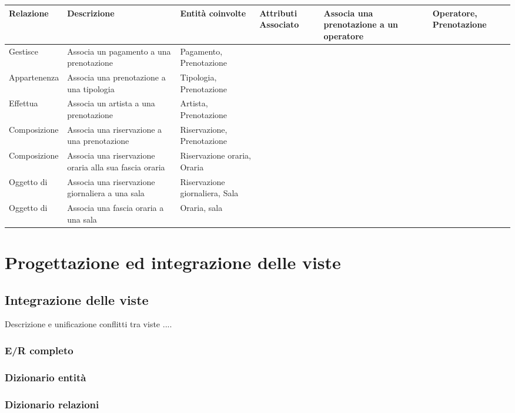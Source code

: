 \documentclass{article}
\begin{document}
\renewcommand*{\arraystretch}{1.4}
\begin{longtable}{|p{.15\linewidth}|p{.25\linewidth}|p{.2\linewidth}|p{.2\linewidth}|}
    \hline
    \textbf{Relazione} & \textbf{Descrizione} & \textbf{Entità coinvolte} & \textbf{Attributi} 
    \endhead 
    \hline
     Associato & Associa una prenotazione a un operatore & Operatore, Prenotazione &  \\ \hline
     Gestisce & Associa un pagamento a una prenotazione & Pagamento, Prenotazione &  \\ \hline
     Appartenenza & Associa una prenotazione a una tipologia & Tipologia, Prenotazione &  \\ \hline
     Effettua & Associa un artista a una prenotazione & Artista, Prenotazione &  \\ \hline
     Composizione & Associa una riservazione a una prenotazione & Riservazione, Prenotazione &  \\ \hline
     Composizione & Associa una riservazione oraria alla sua fascia oraria & Riservazione oraria, Oraria &  \\ \hline
     Oggetto di & Associa una riservazione giornaliera a una sala & Riservazione giornaliera, Sala &  \\ \hline
     Oggetto di & Associa una fascia oraria a una sala & Oraria, sala &  \\ \hline
\end{longtable}

\newpage
\section{Progettazione ed integrazione delle viste}


\subsection{Integrazione delle viste} 
Descrizione e unificazione conflitti tra viste ....
\subsubsection{E/R completo}
\subsubsection{Dizionario entità}
\subsubsection{Dizionario relazioni}
\end{document}

